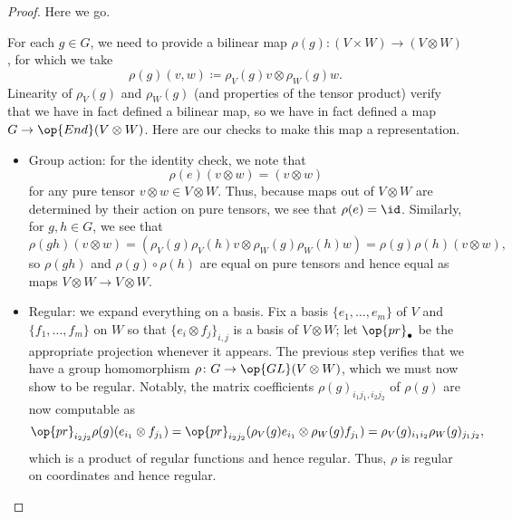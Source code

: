 \documentclass[../notes.tex]{subfiles}
\begin{document}
\begin{proof}
	Here we go.
	\begin{listalph}
		\item For each $g\in G$, we need to provide a bilinear map $\rho(g)\colon(V\times W)\to(V\otimes W)$, for which we take
		\[\rho(g)(v,w)\coloneqq\rho_V(g)v\otimes\rho_W(g)w.\]
		Linearity of $\rho_V(g)$ and $\rho_W(g)$ (and properties of the tensor product) verify that we have in fact defined a bilinear map, so we have in fact defined a map $G\to\op{End}(V\otimes W)$. Here are our checks to make this map a representation.
		\begin{itemize}
			\item Group action: for the identity check, we note that
			\[\rho(e)(v\otimes w)=(v\otimes w)\]
			for any pure tensor $v\otimes w\in V\otimes W$. Thus, because maps out of $V\otimes W$ are determined by their action on pure tensors, we see that $\rho(e)=\id$. Similarly, for $g,h\in G$, we see that
			\[\rho(gh)(v\otimes w)=(\rho_V(g)\rho_V(h)v\otimes\rho_W(g)\rho_W(h)w)=\rho(g)\rho(h)(v\otimes w),\]
			so $\rho(gh)$ and $\rho(g)\circ\rho(h)$ are equal on pure tensors and hence equal as maps $V\otimes W\to V\otimes W$.
			\item Regular: we expand everything on a basis. Fix a basis $\{e_1,\ldots,e_m\}$ of $V$ and $\{f_1,\ldots,f_m\}$ on $W$ so that $\{e_i\otimes f_j\}_{i,j}$ is a basis of $V\otimes W$; let $\op{pr}_\bullet$ be the appropriate projection whenever it appears. The previous step verifies that we have a group homomorphism $\rho\colon G\to\op{GL}(V\otimes W)$, which we must now show to be regular. Notably, the matrix coefficients $\rho(g)_{i_1j_1,i_2j_2}$ of $\rho(g)$ are now computable as
			\[\op{pr}_{i_2j_2}\rho(g)(e_{i_1}\otimes f_{j_1})=\op{pr}_{i_2j_2}(\rho_V(g)e_{i_1}\otimes\rho_W(g)f_{j_1})=\rho_V(g)_{i_1i_2}\rho_W(g)_{j_1j_2},\]
			which is a product of regular functions and hence regular. Thus, $\rho$ is regular on coordinates and hence regular. 
		\end{itemize}


\end{listalph}
\end{proof}
\end{document}
